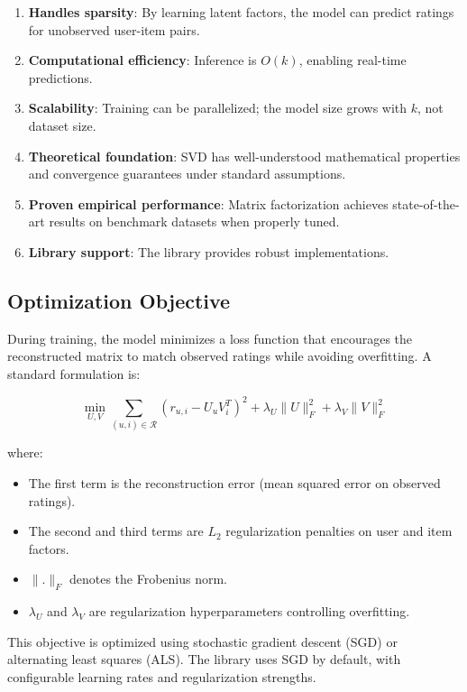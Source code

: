 \begin{enumerate}
  \item \textbf{Handles sparsity}: By learning latent factors, the model can predict ratings for 
  unobserved user-item pairs.
  
  \item \textbf{Computational efficiency}: Inference is $O(k)$, enabling real-time predictions.
  
  \item \textbf{Scalability}: Training can be parallelized; the model size grows with $k$, not dataset size.
  
  \item \textbf{Theoretical foundation}: SVD has well-understood mathematical properties and convergence guarantees 
  under standard assumptions.
  
  \item \textbf{Proven empirical performance}: Matrix factorization achieves state-of-the-art results on 
  benchmark datasets when properly tuned.
  
  \item \textbf{Library support}: The  library provides robust implementations.
\end{enumerate}

\subsection{Optimization Objective}

During training, the model minimizes a loss function that encourages the reconstructed matrix to match 
observed ratings while avoiding overfitting. A standard formulation is:

\[
  \min_{U, V} \sum_{(u,i) \in \mathcal{R}} (r_{u,i} - U_u V_i^T)^2 + \lambda_U \|U\|_F^2 + \lambda_V \|V\|_F^2
\]

where:
\begin{itemize}
  \item The first term is the reconstruction error (mean squared error on observed ratings).
  \item The second and third terms are $L_2$ regularization penalties on user and item factors.
  \item $\|.\|_F$ denotes the Frobenius norm.
  \item $\lambda_U$ and $\lambda_V$ are regularization hyperparameters controlling overfitting.
\end{itemize}

This objective is optimized using stochastic gradient descent (SGD) or alternating least squares (ALS). 
The  library uses SGD by default, with configurable learning rates and regularization strengths.

